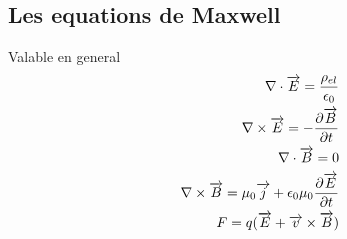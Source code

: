 \documentclass[../main.tex]{subfiles}
\begin{document}
\subsection{Les equations de Maxwell}
Valable en general
\begin{align*}
\nabla \cdot \overrightarrow{E}= \frac{\rho_{el} }{\epsilon_0}\\
\nabla\times \overrightarrow{E}= - \frac{\partial \overrightarrow{B}}{\partial t}\\
\nabla\cdot \overrightarrow{B}=0\\
\nabla\times \overrightarrow{B}= \mu_0 \overrightarrow{j} + \epsilon_0 \mu_0 \frac{\partial \overrightarrow{E}}{\partial t}\\
F= q( \overrightarrow{E}+ \overrightarrow{v}\times \overrightarrow{B}) 	
\end{align*}
\end{document}
